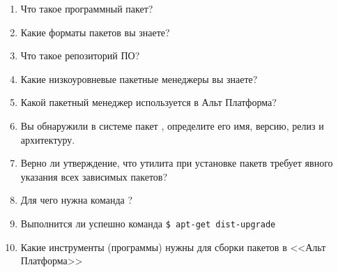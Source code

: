 \begin{enumerate}
	\item Что такое программный пакет?
	\item Какие форматы пакетов вы знаете?
	\item Что такое репозиторий ПО?
	\item Какие низкоуровневые пакетные менеджеры вы знаете?
	\item Какой пакетный менеджер используется в Альт Платформа?
	\item Вы обнаружили в системе пакет , определите его имя, версию, релиз и архитектуру.
	\item Верно ли утверждение, что утилита  при установке пакетв требует явного указания всех зависимых пакетов?
	\item Для чего нужна команда ?
	\item Выполнится ли успешно команда \verb!$ apt-get dist-upgrade!
	\item Какие инструменты (программы) нужны для сборки пакетов в <<Альт Платформа>>
\end{enumerate}
